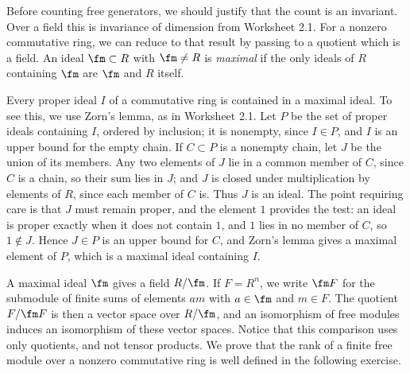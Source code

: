 \documentclass[12pt,reqno]{amsart}
\begin{document}
\hrulefill

Before counting free generators, we should justify that the count is an invariant. Over a field this is invariance of dimension from Worksheet 2.1. For a nonzero commutative ring, we can reduce to that result by passing to a quotient which is a field. An ideal $\fm\subset R$ with $\fm\neq R$ is \emph{maximal} if the only ideals of $R$ containing $\fm$ are $\fm$ and $R$ itself.

Every proper ideal $I$ of a commutative ring is contained in a maximal ideal. To see this, we use Zorn's lemma, as in Worksheet 2.1. Let $P$ be the set of proper ideals containing $I$, ordered by inclusion; it is nonempty, since $I\in P$, and $I$ is an upper bound for the empty chain. If $C\subset P$ is a nonempty chain, let $J$ be the union of its members. Any two elements of $J$ lie in a common member of $C$, since $C$ is a chain, so their sum lies in $J$; and $J$ is closed under multiplication by elements of $R$, since each member of $C$ is. Thus $J$ is an ideal. The point requiring care is that $J$ must remain proper, and the element $1$ provides the test: an ideal is proper exactly when it does not contain $1$, and $1$ lies in no member of $C$, so $1\notin J$. Hence $J\in P$ is an upper bound for $C$, and Zorn's lemma gives a maximal element of $P$, which is a maximal ideal containing $I$.

A maximal ideal $\fm$ gives a field $R/\fm$. If $F=R^n$, we write $\fm F$ for the submodule of finite sums of elements $am$ with $a\in\fm$ and $m\in F$. The quotient $F/\fm F$ is then a vector space over $R/\fm$, and an isomorphism of free modules induces an isomorphism of these vector spaces. Notice that this comparison uses only quotients, and not tensor products. We prove that the rank of a finite free module over a nonzero commutative ring is well defined in the following exercise.

\hrulefill
\end{document}
